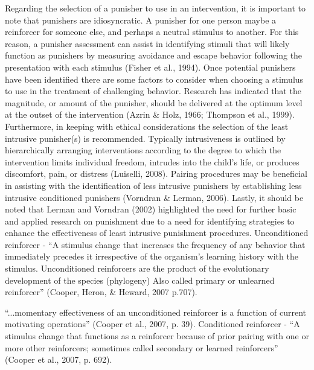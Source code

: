 Regarding the selection of a punisher to use in an intervention, it is important to note that punishers are idiosyncratic. A punisher for one person maybe a reinforcer for someone else, and perhaps a neutral stimulus to another. For this reason, a punisher assessment can assist in identifying stimuli that will likely function as punishers by measuring avoidance and escape behavior following the presentation with each stimulus (Fisher et al., 1994). Once potential punishers have been identified there are some factors to consider when choosing a stimulus to use in the treatment of challenging behavior. Research has indicated that the magnitude, or amount of the punisher, should be delivered at the optimum level at the outset of the intervention (Azrin \& Holz, 1966; Thompson et al., 1999).  Furthermore, in keeping with ethical considerations the selection of the least intrusive punisher(s) is recommended.  Typically intrusiveness is outlined by hierarchically arranging interventions according to the degree to which the intervention limits individual freedom, intrudes into the child's life, or produces discomfort, pain, or distress (Luiselli, 2008). Pairing procedures may be beneficial in assisting with the identification of less intrusive punishers by establishing less intrusive conditioned punishers (Vorndran \& Lerman, 2006).  Lastly, it should be noted that Lerman and Vorndran (2002) highlighted the need for further basic and applied research on punishment due to a need for identifying strategies to enhance the effectiveness of least intrusive punishment procedures. 
%
Unconditioned reinforcer - ``A stimulus change that increases the frequency of any behavior that immediately precedes it irrespective of the organism's learning history with the stimulus. Unconditioned reinforcers are the product of the evolutionary development of the species (phylogeny) Also called primary or unlearned reinforcer'' (Cooper, Heron, \& Heward, 2007 p.707).

``...momentary effectiveness of an unconditioned reinforcer is a function of current motivating operations'' (Cooper et al., 2007, p. 39).
%
Conditioned reinforcer - ``A stimulus change that functions as a reinforcer because of prior pairing with one or more other reinforcers; sometimes called secondary or learned reinforcers'' (Cooper et al., 2007, p. 692). 

